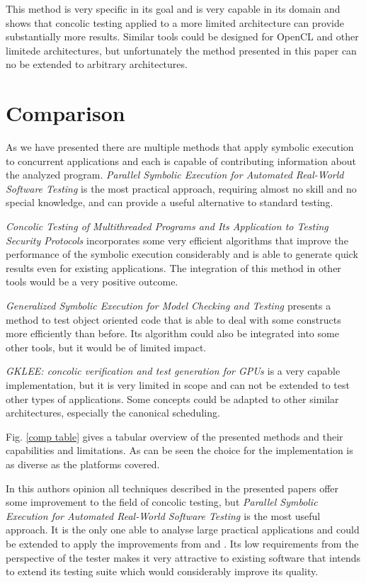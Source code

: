 \documentclass[10pt]{llncs}
\begin{document}
This method is very specific in its goal and is very capable in its domain and shows that concolic testing applied to a more limited architecture can provide substantially more results. Similar tools could be designed for OpenCL and other limitede architectures, but unfortunately the method presented in this paper can no be extended to arbitrary architectures.

\section{Comparison}
\label{comparison}

As we have presented there are multiple methods that apply symbolic execution to concurrent applications and each is capable of contributing information about the analyzed program. \emph{Parallel Symbolic Execution for Automated Real-World Software Testing} \cite{base3} is the most practical approach, requiring almost no skill and no special knowledge, and can provide a useful alternative to standard testing.

\emph{Concolic Testing of Multithreaded Programs and Its Application to Testing Security Protocols} \cite{base4} incorporates some very efficient algorithms that improve the performance of the symbolic execution considerably and is able to generate quick results even for existing applications. The integration of this method in other tools would be a very positive outcome.

\emph{Generalized Symbolic Execution for Model Checking and Testing \cite{base5}} presents a method to test object oriented code that is able to deal with some constructs more efficiently than before. Its algorithm could also be integrated into some other tools, but it would be of limited impact.

\emph{GKLEE: concolic verification and test generation for GPUs \cite{base7}} is a very capable implementation, but it is very limited in scope and can not be extended to test other types of applications. Some concepts could be adapted to other similar architectures, especially the canonical scheduling.

Fig. \ref{comp table} gives a tabular overview of the presented methods and their capabilities and limitations. As can be seen the choice for the implementation is as diverse as the platforms covered.

In this authors opinion all techniques described in the presented papers offer some improvement to the field of concolic testing, but \emph{Parallel Symbolic Execution for Automated Real-World Software Testing \cite{base3}} is the most useful approach. It is the only one able to analyse large practical applications and could be extended to apply the improvements from \cite{base4} and \cite{base5}. Its low requirements from the perspective of the tester makes it very attractive to existing software that intends to extend its testing suite which would considerably improve its quality.
\end{document}
